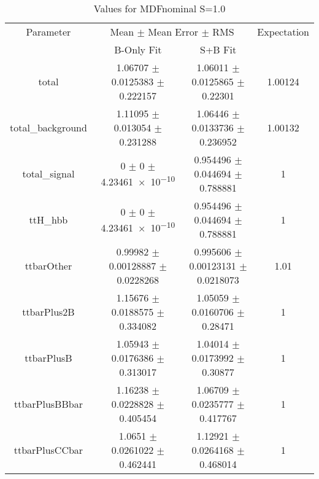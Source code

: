 \begin{table}
\centering
\caption{Values for MDFnominal S=1.0}
\begin{tabular}{cccc}
\toprule
Parameter & \multicolumn{2}{c}{Mean $\pm$ Mean Error $\pm$ RMS} & Expectation\\
 & B-Only Fit & S+B Fit & \\
\midrule
total & \num{1.06707} $\pm$ \num{0.0125383} $\pm$ \num{0.222157} & \num{1.06011} $\pm$ \num{0.0125865} $\pm$ \num{0.22301} & \num{1.00124}\\
total\_background & \num{1.11095} $\pm$ \num{0.013054} $\pm$ \num{0.231288} & \num{1.06446} $\pm$ \num{0.0133736} $\pm$ \num{0.236952} & \num{1.00132}\\
total\_signal & \num{0} $\pm$ \num{0} $\pm$ \num{4.23461e-10} & \num{0.954496} $\pm$ \num{0.044694} $\pm$ \num{0.788881} & \num{1}\\
ttH\_hbb & \num{0} $\pm$ \num{0} $\pm$ \num{4.23461e-10} & \num{0.954496} $\pm$ \num{0.044694} $\pm$ \num{0.788881} & \num{1}\\
ttbarOther & \num{0.99982} $\pm$ \num{0.00128887} $\pm$ \num{0.0228268} & \num{0.995606} $\pm$ \num{0.00123131} $\pm$ \num{0.0218073} & \num{1.01}\\
ttbarPlus2B & \num{1.15676} $\pm$ \num{0.0188575} $\pm$ \num{0.334082} & \num{1.05059} $\pm$ \num{0.0160706} $\pm$ \num{0.28471} & \num{1}\\
ttbarPlusB & \num{1.05943} $\pm$ \num{0.0176386} $\pm$ \num{0.313017} & \num{1.04014} $\pm$ \num{0.0173992} $\pm$ \num{0.30877} & \num{1}\\
ttbarPlusBBbar & \num{1.16238} $\pm$ \num{0.0228828} $\pm$ \num{0.405454} & \num{1.06709} $\pm$ \num{0.0235777} $\pm$ \num{0.417767} & \num{1}\\
ttbarPlusCCbar & \num{1.0651} $\pm$ \num{0.0261022} $\pm$ \num{0.462441} & \num{1.12921} $\pm$ \num{0.0264168} $\pm$ \num{0.468014} & \num{1}\\
\bottomrule
\end{tabular}
\end{table}